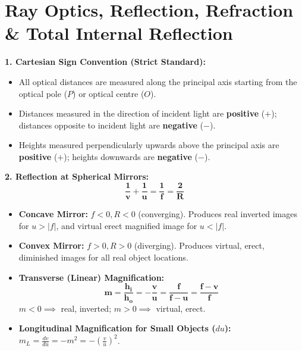 \documentclass[10pt,twoside,openright]{book}
\begin{document}
\section{Ray Optics, Reflection, Refraction \& Total Internal Reflection}

\begin{conceptbox}
\textbf{1. Cartesian Sign Convention (Strict Standard):}
\begin{itemize}
  \item All optical distances are measured along the principal axis starting from the optical pole ($P$) or optical centre ($O$).
  \item Distances measured in the direction of incident light are \textbf{positive} ($+$); distances opposite to incident light are \textbf{negative} ($-$).
  \item Heights measured perpendicularly upwards above the principal axis are \textbf{positive} ($+$); heights downwards are \textbf{negative} ($-$).
\end{itemize}
\textbf{2. Reflection at Spherical Mirrors:}
\begin{equation}
  \mathbf{\frac{1}{v} + \frac{1}{u} = \frac{1}{f} = \frac{2}{R}}
\end{equation}
\begin{itemize}
  \item \textbf{Concave Mirror:} $f < 0, R < 0$ (converging). Produces real inverted images for $u > |f|$, and virtual erect magnified image for $u < |f|$.
  \item \textbf{Convex Mirror:} $f > 0, R > 0$ (diverging). Produces virtual, erect, diminished images for all real object locations.
  \item \textbf{Transverse (Linear) Magnification:}
  \begin{equation}
    \mathbf{m = \frac{h_i}{h_o} = -\frac{v}{u} = \frac{f}{f - u} = \frac{f - v}{f}}
  \end{equation}
  $m < 0 \implies$ real, inverted; $m > 0 \implies$ virtual, erect.
  \item \textbf{Longitudinal Magnification for Small Objects ($du$):} $m_L = \frac{dv}{du} = -m^2 = -\left(\frac{v}{u}\right)^2$.
\end{itemize}
\end{conceptbox}
\end{document}
